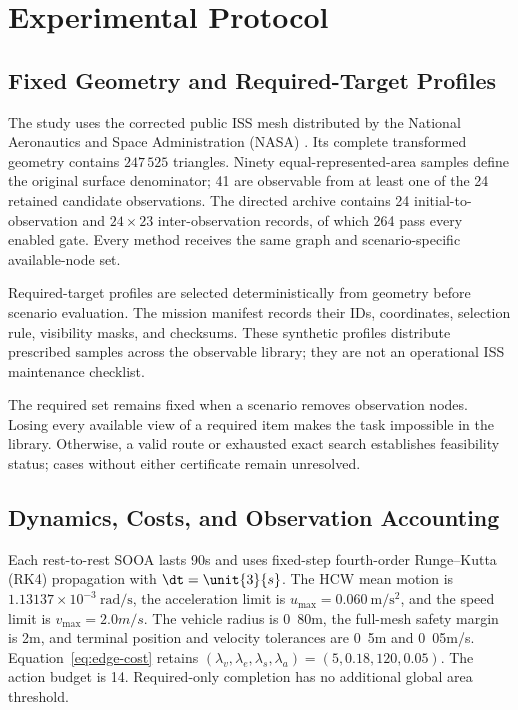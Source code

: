 
\section{Experimental Protocol}
\label{sec:simulation}

\subsection{Fixed Geometry and Required-Target Profiles}

The study uses the corrected public ISS mesh distributed by the National Aeronautics and Space Administration (NASA) \cite{nasa_iss_gltf_model}. Its complete transformed geometry contains $247\,525$ triangles. Ninety equal-represented-area samples define the original surface denominator; 41 are observable from at least one of the 24 retained candidate observations. The directed archive contains 24 initial-to-observation and $24\times23$ inter-observation records, of which 264 pass every enabled gate. Every method receives the same graph and scenario-specific available-node set.

Required-target profiles are selected deterministically from geometry before scenario evaluation. The mission manifest records their IDs, coordinates, selection rule, visibility masks, and checksums. These synthetic profiles distribute prescribed samples across the observable library; they are not an operational ISS maintenance checklist.



The required set remains fixed when a scenario removes observation nodes. Losing every available view of a required item makes the task impossible in the library. Otherwise, a valid route or exhausted exact search establishes feasibility status; cases without either certificate remain unresolved.

\subsection{Dynamics, Costs, and Observation Accounting}

Each rest-to-rest SOOA lasts \unit{90}{s} and uses fixed-step fourth-order Runge--Kutta (RK4) propagation with $\dt=\unit{3}{s}$. The HCW mean motion is $1.13137\times10^{-3}~\mathrm{rad/s}$, the acceleration limit is $u_{\max}=0.060~\mathrm{m/s^2}$, and the speed limit is $v_{\max}=\unit{2.0}{m/s}$. The vehicle radius is \unit{0.80}{m}, the full-mesh safety margin is \unit{2}{m}, and terminal position and velocity tolerances are \unit{0.5}{m} and \unit{0.05}{m/s}. Equation~\eqref{eq:edge-cost} retains $(\lambda_v,\lambda_e,\lambda_s,\lambda_a)=(5,0.18,120,0.05)$. The action budget is 14. Required-only completion has no additional global area threshold.

